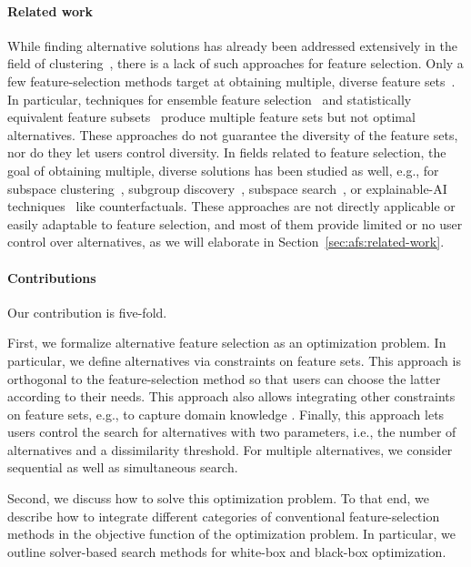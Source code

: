 \documentclass{article}
\theoremstyle{definition}
\begin{document}
\paragraph{Related work}

While finding alternative solutions has already been addressed extensively in the field of clustering~\cite{bailey2014alternative}, there is a lack of such approaches for feature selection.
Only a few feature-selection methods target at obtaining multiple, diverse feature sets~\cite{borboudakis2021extending}.
In particular, techniques for ensemble feature selection~\cite{saeys2008robust, seijo2017ensemble} and statistically equivalent feature subsets~\cite{lagani2017feature} produce multiple feature sets but not optimal alternatives.
These approaches do not guarantee the diversity of the feature sets, nor do they let users control diversity.
In fields related to feature selection, the goal of obtaining multiple, diverse solutions has been studied as well, e.g., for subspace clustering~\cite{hu2018subspace, mueller2009relevant}, subgroup discovery~\cite{leeuwen2012diverse}, subspace search~\cite{trittenbach2019dimension}, or explainable-AI techniques~\cite{artelt2022even, kim2016examples, mothilal2020explaining, russell2019efficient} like counterfactuals.
These approaches are not directly applicable or easily adaptable to feature selection, and most of them provide limited or no user control over alternatives, as we will elaborate in Section~\ref{sec:afs:related-work}.

\paragraph{Contributions}

Our contribution is five-fold.

First, we formalize alternative feature selection as an optimization problem.
In particular, we define alternatives via constraints on feature sets.
This approach is orthogonal to the feature-selection method so that users can choose the latter according to their needs.
This approach also allows integrating other constraints on feature sets, e.g., to capture domain knowledge \cite{bach2022empirical, groves2015toward}.
Finally, this approach lets users control the search for alternatives with two parameters, i.e., the number of alternatives and a dissimilarity threshold.
For multiple alternatives, we consider sequential as well as simultaneous search.

Second, we discuss how to solve this optimization problem.
To that end, we describe how to integrate different categories of conventional feature-selection methods in the objective function of the optimization problem.
In particular, we outline solver-based search methods for white-box and black-box optimization.
\end{document}
